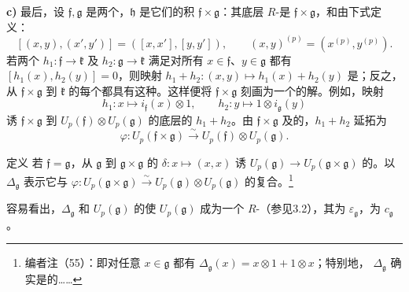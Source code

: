 \textbf{c)} 最后，设 $\mathfrak f,\mathfrak g$ 是两个，$\mathfrak h$ 是它们的积 $\mathfrak f\times\mathfrak g$：其底层 $R$-是 $\mathfrak f\times\mathfrak g$，和由下式定义：
\[
 [(x,y),(x',y')]=([x,x'],[y,y']),\qquad
 (x,y)^{(p)}=(x^{(p)},y^{(p)}).
\]
若两个 $h_1:\mathfrak f\to\mathfrak k$ 及 $h_2:\mathfrak g\to\mathfrak k$ 满足对所有 $x\in\mathfrak f$、$y\in\mathfrak g$ 都有 $[h_1(x),h_2(y)]=0$，则映射
$h_1+h_2:(x,y)\mapsto h_1(x)+h_2(y)$ 是；反之，从 $\mathfrak f\times\mathfrak g$ 到 $\mathfrak k$ 的每个都具有这种。这样便将 $\mathfrak f\times\mathfrak g$ 刻画为一个的解。例如，映射
\[
 h_1:x\mapsto i_{\mathfrak f}(x)\otimes1,\qquad
 h_2:y\mapsto1\otimes i_{\mathfrak g}(y)
\]
诱 $\mathfrak f\times\mathfrak g$ 到 $U_p(\mathfrak f)\otimes U_p(\mathfrak g)$ 的底层的 $h_1+h_2$。由 $\mathfrak f\times\mathfrak g$ 及的，$h_1+h_2$ 延拓为
\[
 \varphi:U_p(\mathfrak f\times\mathfrak g)\xrightarrow{\sim}
 U_p(\mathfrak f)\otimes U_p(\mathfrak g).
\]
\begin{SGAresult}{定义}{}
若 $\mathfrak f=\mathfrak g$，从 $\mathfrak g$ 到 $\mathfrak g\times\mathfrak g$ 的 $\delta:x\mapsto(x,x)$ 诱 $U_p(\mathfrak g)\to U_p(\mathfrak g\times\mathfrak g)$ 的。以 $\Delta_{\mathfrak g}$ 表示它与 $\varphi:U_p(\mathfrak g\times\mathfrak g)\xrightarrow{\sim}U_p(\mathfrak g)\otimes U_p(\mathfrak g)$ 的复合。\footnote{编者注（55）：即对任意 $x\in\mathfrak g$ 都有 $\Delta_{\mathfrak g}(x)=x\otimes1+1\otimes x$；特别地， $\Delta_{\mathfrak g}$ 确实是的……}
\end{SGAresult}
容易看出，$\Delta_{\mathfrak g}$ 和 $U_p(\mathfrak g)$ 的使 $U_p(\mathfrak g)$ 成为一个 $R$-（参见3.2），其为 $\varepsilon_{\mathfrak g}$，为 $c_{\mathfrak g}$。

